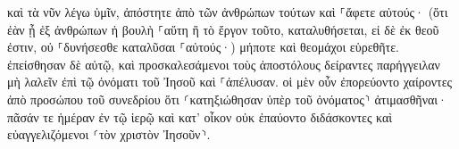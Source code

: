 \documentclass{openreader}
\begin{document}
καὶ τὰ νῦν λέγω ὑμῖν, ἀπόστητε ἀπὸ τῶν ἀνθρώπων τούτων καὶ ⸀ἄφετε αὐτούς· (ὅτι ἐὰν ᾖ ἐξ ἀνθρώπων ἡ βουλὴ ⸀αὕτη ἢ τὸ ἔργον τοῦτο, καταλυθήσεται, 
εἰ δὲ ἐκ θεοῦ ἐστιν, οὐ ⸀δυνήσεσθε καταλῦσαι ⸀αὐτούς·) μήποτε καὶ θεομάχοι εὑρεθῆτε. ἐπείσθησαν δὲ αὐτῷ, 
καὶ προσκαλεσάμενοι τοὺς ἀποστόλους δείραντες παρήγγειλαν μὴ λαλεῖν ἐπὶ τῷ ὀνόματι τοῦ Ἰησοῦ καὶ ⸀ἀπέλυσαν. 
οἱ μὲν οὖν ἐπορεύοντο χαίροντες ἀπὸ προσώπου τοῦ συνεδρίου ὅτι ⸂κατηξιώθησαν ὑπὲρ τοῦ ὀνόματος⸃ ἀτιμασθῆναι· 
πᾶσάν τε ἡμέραν ἐν τῷ ἱερῷ καὶ κατ’ οἶκον οὐκ ἐπαύοντο διδάσκοντες καὶ εὐαγγελιζόμενοι ⸂τὸν χριστὸν Ἰησοῦν⸃. 
\end{document}
